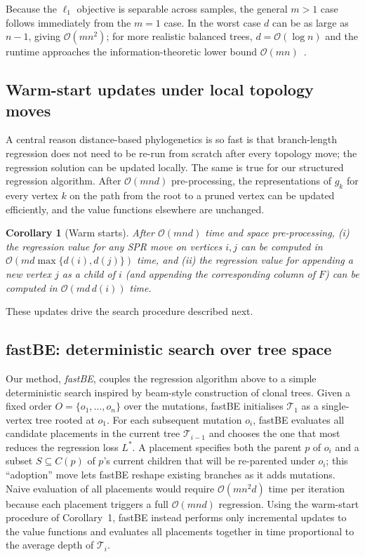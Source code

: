 \documentclass[11pt]{article}
\newtheorem{corollary}[theorem]{Corollary}
\begin{document}
Because the $\ell_1$ objective is separable across samples, the general $m > 1$ case follows immediately from the $m=1$ case. In the worst case $d$ can be as large as $n-1$, giving $\mathcal{O}(mn^2)$; for more realistic balanced trees, $d = \mathcal{O}(\log n)$ and the runtime approaches the information-theoretic lower bound $\mathcal{O}(mn)$~\citep{elkebir2015reconstruction}.

\subsection{Warm-start updates under local topology moves}

A central reason distance-based phylogenetics is so fast is that branch-length regression does not need to be re-run from scratch after every topology move; the regression solution can be updated locally. The same is true for our structured regression algorithm. After $\mathcal{O}(mnd)$ pre-processing, the representations of $g_k$ for every vertex $k$ on the path from the root to a pruned vertex can be updated efficiently, and the value functions elsewhere are unchanged.

\begin{corollary}[Warm starts]
After $\mathcal{O}(mnd)$ time and space pre-processing,
(i) the regression value for any SPR move on vertices $i, j$ can be computed in $\mathcal{O}(md\max\{d(i), d(j)\})$ time, and
(ii) the regression value for appending a new vertex $j$ as a child of $i$ (and appending the corresponding column of $F$) can be computed in $\mathcal{O}(md\,d(i))$ time.
\end{corollary}

These updates drive the search procedure described next.

\subsection{fastBE: deterministic search over tree space}

Our method, \emph{fastBE}, couples the regression algorithm above to a simple deterministic search inspired by beam-style construction of clonal trees. Given a fixed order $O = \{o_1,\ldots,o_n\}$ over the mutations, fastBE initialises $\mathcal{T}_1$ as a single-vertex tree rooted at $o_1$. For each subsequent mutation $o_i$, fastBE evaluates all candidate placements in the current tree $\mathcal{T}_{i-1}$ and chooses the one that most reduces the regression loss $L^*$. A placement specifies both the parent $p$ of $o_i$ and a subset $S\subseteq C(p)$ of $p$'s current children that will be re-parented under $o_i$; this ``adoption'' move lets fastBE reshape existing branches as it adds mutations. Naive evaluation of all placements would require $\mathcal{O}(mn^2 d)$ time per iteration because each placement triggers a full $\mathcal{O}(mnd)$ regression. Using the warm-start procedure of Corollary~1, fastBE instead performs only incremental updates to the value functions and evaluates all placements together in time proportional to the average depth of $\mathcal{T}_i$.
\end{document}
